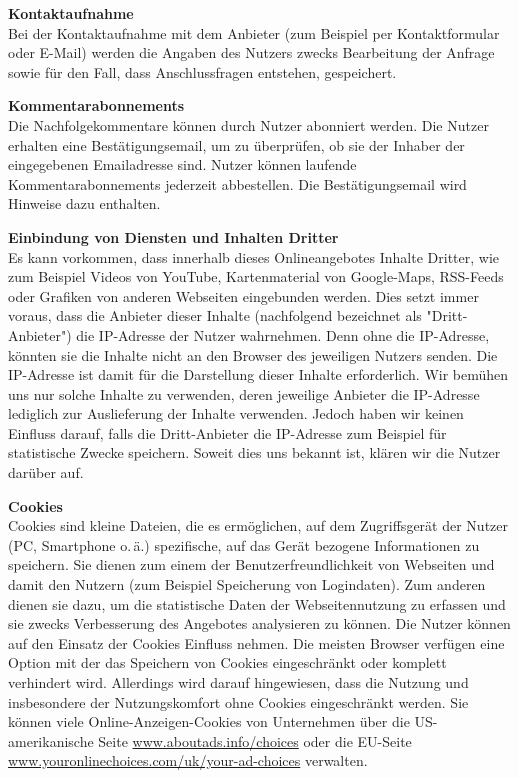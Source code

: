 {\textbf{Kontaktaufnahme}\\
Bei der Kontaktaufnahme mit dem Anbieter (zum Beispiel per Kontaktformular oder E-Mail) werden die Angaben des Nutzers zwecks Bearbeitung der Anfrage sowie für den Fall, dass Anschlussfragen entstehen, gespeichert.

\textbf{Kommentarabonnements}\\
Die Nachfolgekommentare können durch Nutzer abonniert werden. Die Nutzer erhalten eine Bestätigungsemail, um zu überprüfen, ob sie der Inhaber der eingegebenen Emailadresse sind. Nutzer können laufende Kommentarabonnements jederzeit abbestellen. Die Bestätigungsemail wird Hinweise dazu enthalten.

\textbf{Einbindung von Diensten und Inhalten Dritter}\\
Es kann vorkommen, dass innerhalb dieses Onlineangebotes Inhalte Dritter, wie zum Beispiel Videos von YouTube, Kartenmaterial von Google-Maps, RSS-Feeds oder Grafiken von anderen Webseiten eingebunden werden. Dies setzt immer voraus, dass die Anbieter dieser Inhalte (nachfolgend bezeichnet als "Dritt-Anbieter") die IP-Adresse der Nutzer wahrnehmen. Denn ohne die IP-Adresse, könnten sie die Inhalte nicht an den Browser des jeweiligen Nutzers senden. Die IP-Adresse ist damit für die Darstellung dieser Inhalte erforderlich. Wir bemühen uns nur solche Inhalte zu verwenden, deren jeweilige Anbieter die IP-Adresse lediglich zur Auslieferung der Inhalte verwenden. Jedoch haben wir keinen Einfluss darauf, falls die Dritt-Anbieter die IP-Adresse zum Beispiel für statistische Zwecke speichern. Soweit dies uns bekannt ist, klären wir die Nutzer darüber auf.

\textbf{Cookies}\\
Cookies sind kleine Dateien, die es ermöglichen, auf dem Zugriffsgerät der Nutzer (PC, Smartphone o.\,ä.) spezifische, auf das Gerät bezogene Informationen zu speichern. Sie dienen zum einem der Benutzerfreundlichkeit von Webseiten und damit den Nutzern (zum Beispiel Speicherung von Logindaten). Zum anderen dienen sie dazu, um die statistische Daten der Webseitennutzung zu erfassen und sie zwecks Verbesserung des Angebotes analysieren zu können. Die Nutzer können auf den Einsatz der Cookies Einfluss nehmen. Die meisten Browser verfügen eine Option mit der das Speichern von Cookies eingeschränkt oder komplett verhindert wird. Allerdings wird darauf hingewiesen, dass die Nutzung und insbesondere der Nutzungskomfort ohne Cookies eingeschränkt werden. Sie können viele Online-Anzeigen-Cookies von Unternehmen über die US-amerikanische Seite \url{www.aboutads.info/choices} oder die EU-Seite \url{www.youronlinechoices.com/uk/your-ad-choices} verwalten.

}
